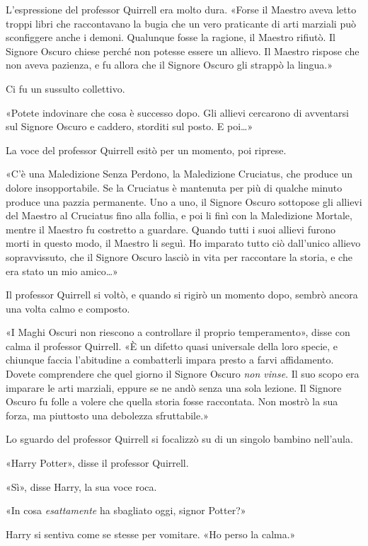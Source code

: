 L’espressione del professor Quirrell era molto dura. «Forse il Maestro aveva letto troppi libri che raccontavano la bugia che un vero praticante di arti marziali può sconfiggere anche i demoni. Qualunque fosse la ragione, il Maestro rifiutò. Il Signore Oscuro chiese perché non potesse essere un allievo. Il Maestro rispose che non aveva pazienza, e fu allora che il Signore Oscuro gli strappò la lingua.»

Ci fu un sussulto collettivo.

«Potete indovinare che cosa è successo dopo. Gli allievi cercarono di avventarsi sul Signore Oscuro e caddero, storditi sul posto. E poi…»

La voce del professor Quirrell esitò per un momento, poi riprese.

«C’è una Maledizione Senza Perdono, la Maledizione Cruciatus, che produce un dolore insopportabile. Se la Cruciatus è mantenuta per più di qualche minuto produce una pazzia permanente. Uno a uno, il Signore Oscuro sottopose gli allievi del Maestro al Cruciatus fino alla follia, e poi li finì con la Maledizione Mortale, mentre il Maestro fu costretto a guardare. Quando tutti i suoi allievi furono morti in questo modo, il Maestro li seguì. Ho imparato tutto ciò dall’unico allievo sopravvissuto, che il Signore Oscuro lasciò in vita per raccontare la storia, e che era stato un mio amico…»

Il professor Quirrell si voltò, e quando si rigirò un momento dopo, sembrò ancora una volta calmo e composto.

«I Maghi Oscuri non riescono a controllare il proprio temperamento», disse con calma il professor Quirrell. «È un difetto quasi universale della loro specie, e chiunque faccia l’abitudine a combatterli impara presto a farvi affidamento. Dovete comprendere che quel giorno il Signore Oscuro \textit{non vinse}. Il suo scopo era imparare le arti marziali, eppure se ne andò senza una sola lezione. Il Signore Oscuro fu folle a volere che quella storia fosse raccontata. Non mostrò la sua forza, ma piuttosto una debolezza sfruttabile.»

Lo sguardo del professor Quirrell si focalizzò su di un singolo bambino nell’aula.

«Harry Potter», disse il professor Quirrell.

«Sì», disse Harry, la sua voce roca.

«In cosa \textit{esattamente} ha sbagliato oggi, signor Potter?»

Harry si sentiva come se stesse per vomitare. «Ho perso la calma.»

